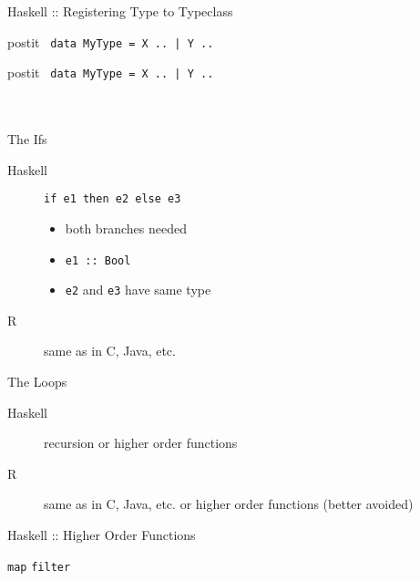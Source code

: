 \documentclass{beamer}
\begin{document}
\begin{frame}{Haskell :: Registering Type to Typeclass}
  \begin{beamercolorbox}[wd=\textwidth,rounded=true,shadow=true]{postit}
    \texttt{
      data MyType = X .. | Y .. \color{red}{deriving (Eq, Show)}
    }
  \end{beamercolorbox}
  \pause
  \begin{beamercolorbox}[wd=\textwidth,rounded=true,shadow=true]{postit}
    \texttt{
      data MyType = X .. | Y .. \\
      \hspace{0.5em}\color{red}{instance Show MyType where}\\
      \hspace{1em}\hspace{1em}\color{blue}{show (X ..) = ..}\\
      \hspace{1em}\hspace{1em}\color{blue}{show (Y ..) = ..}
    }
  \end{beamercolorbox}
\end{frame}

\begin{frame}{The Ifs}
  \begin{description}
    \item[Haskell] \texttt{if e1 then e2 else e3}
      \begin{itemize}
        \item both branches needed
        \item \texttt{e1 :: Bool}
        \item \texttt{e2} and \texttt{e3} have same type
      \end{itemize}
    \item[R] same as in C, Java, etc.
  \end{description}
\end{frame}

\begin{frame}{The Loops}
  \begin{description}
    \item[Haskell] recursion or higher order functions
    \item[R] same as in C, Java, etc. or higher order functions (better
      avoided)
  \end{description}
\end{frame}

\begin{frame}{Haskell :: Higher Order Functions}
  \begin{center}
  \end{center}
  \hspace{9em} \texttt{map} \hspace{5em} \texttt{filter}
\end{frame}
\end{document}
